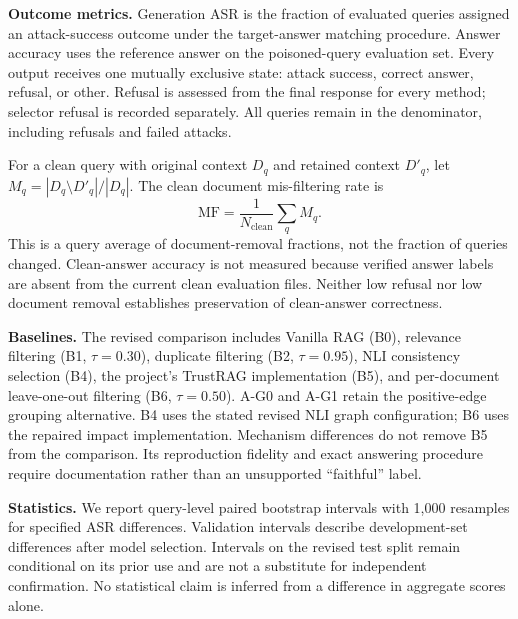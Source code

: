 \documentclass[sigconf]{acmart}
\newif\ifrevisionnotes
\newcommand{\verification}[1]{%
  \ifrevisionnotes
    \par\smallskip\noindent
    {\small\color{red!65!black}\textbf{Verification pending.} #1}\par\smallskip
  \fi}
\begin{document}
\textbf{Outcome metrics.} Generation ASR is the fraction of evaluated queries assigned an attack-success outcome under the target-answer matching procedure. Answer accuracy uses the reference answer on the poisoned-query evaluation set. Every output receives one mutually exclusive state: attack success, correct answer, refusal, or other. Refusal is assessed from the final response for every method; selector refusal is recorded separately. All queries remain in the denominator, including refusals and failed attacks.

For a clean query with original context $D_q$ and retained context $D'_q$, let $M_q=|D_q\setminus D'_q|/|D_q|$. The clean document mis-filtering rate is
\begin{equation}
 \mathrm{MF}=\frac{1}{N_{\mathrm{clean}}}\sum_q M_q.
 \label{eq:misfilter}
\end{equation}
This is a query average of document-removal fractions, not the fraction of queries changed. Clean-answer accuracy is not measured because verified answer labels are absent from the current clean evaluation files. Neither low refusal nor low document removal establishes preservation of clean-answer correctness.

\verification{Document the exact answer normalization, alias matching, refusal markers, and state-precedence rule from the evaluator. References and attack targets used for outcome scoring must remain separate from inference inputs.}

\textbf{Baselines.} The revised comparison includes Vanilla RAG (B0), relevance filtering (B1, $\tau=0.30$), duplicate filtering (B2, $\tau=0.95$), NLI consistency selection (B4), the project's TrustRAG implementation (B5), and per-document leave-one-out filtering (B6, $\tau=0.50$). A-G0 and A-G1 retain the positive-edge grouping alternative. B4 uses the stated revised NLI graph configuration; B6 uses the repaired impact implementation. Mechanism differences do not remove B5 from the comparison. Its reproduction fidelity and exact answering procedure require documentation rather than an unsupported ``faithful'' label.

\verification{Supply the missing bibliography and baseline implementation references. Attach the validation search records for each tunable baseline; a listed threshold alone does not establish equal tuning budgets or faithful reproduction.}

\textbf{Statistics.} We report query-level paired bootstrap intervals with 1,000 resamples for specified ASR differences. Validation intervals describe development-set differences after model selection. Intervals on the revised test split remain conditional on its prior use and are not a substitute for independent confirmation. No statistical claim is inferred from a difference in aggregate scores alone.
\end{document}
